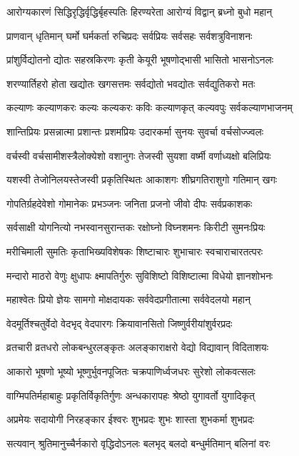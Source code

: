 \twolineshloka
{आरोग्यकारणं सिद्धिरृद्धिर्वृद्धिर्बृहस्पतिः}
{हिरण्यरेता आरोग्यं विद्वान् ब्रध्नो बुधो महान्}%

\twolineshloka
{प्राणवान् धृतिमान् घर्मो घर्मकर्ता रुचिप्रदः}
{सर्वप्रियः सर्वसहः सर्वशत्रुविनाशनः}%

\twolineshloka
{प्रांशुर्विद्योतनो द्योतः सहस्रकिरणः कृती}
{केयूरी भूषणोद्भासी भासितो भासनोऽनलः}%

\twolineshloka
{शरण्यार्तिहरो होता खद्योतः खगसत्तमः}
{सर्वद्योतो भवद्योतः सर्वद्युतिकरो मतः}%

\twolineshloka
{कल्याणः कल्याणकरः कल्यः कल्यकरः कविः}
{कल्याणकृत् कल्यवपुः सर्वकल्याणभाजनम्}%

\twolineshloka
{शान्तिप्रियः प्रसन्नात्मा प्रशान्तः प्रशमप्रियः}
{उदारकर्मा सुनयः सुवर्चा वर्चसोज्ज्वलः}%

\twolineshloka
{वर्चस्वी वर्चसामीशस्त्रैलोक्येशो वशानुगः}
{तेजस्वी सुयशा वर्ष्मी वर्णाध्यक्षो बलिप्रियः}%

\twolineshloka
{यशस्वी तेजोनिलयस्तेजस्वी प्रकृतिस्थितः}
{आकाशगः शीघ्रगतिराशुगो गतिमान् खगः}%

\twolineshloka
{गोपतिर्ग्रहदेवेशो गोमानेकः प्रभञ्जनः}
{जनिता प्रजनो जीवो दीपः सर्वप्रकाशकः}%

\twolineshloka
{सर्वसाक्षी योगनित्यो नभस्वानसुरान्तकः}
{रक्षोघ्नो विघ्नशमनः किरीटी सुमनःप्रियः}%

\twolineshloka
{मरीचिमाली सुमतिः कृताभिख्यविशेषकः}
{शिष्टाचारः शुभाचारः स्वचाराचारतत्परः}%

\twolineshloka
{मन्दारो माठरो वेणुः क्षुधापः क्ष्मापतिर्गुरुः}
{सुविशिष्टो विशिष्टात्मा विधेयो ज्ञानशोभनः}%

\twolineshloka
{महाश्वेतः प्रियो ज्ञेयः सामगो मोक्षदायकः}
{सर्ववेदप्रगीतात्मा सर्ववेदलयो महान्}%

\twolineshloka
{वेदमूर्तिश्चतुर्वेदो वेदभृद् वेदपारगः}
{क्रियावानसितो जिष्णुर्वरीयांशुर्वरप्रदः}%

\twolineshloka
{व्रतचारी व्रतधरो लोकबन्धुरलङ्कृतः}
{अलङ्काराक्षरो वेद्यो विद्यावान् विदिताशयः}%

\twolineshloka
{आकारो भूषणो भूष्यो भूष्णुर्भुवनपूजितः}
{चक्रपाणिर्ध्वजधरः सुरेशो लोकवत्सलः}%

\twolineshloka
{वाग्मिपतिर्महाबाहुः प्रकृतिर्विकृतिर्गुणः}
{अन्धकारापहः श्रेष्ठो युगावर्तो युगादिकृत्}%

\twolineshloka
{अप्रमेयः सदायोगी निरहङ्कार ईश्वरः}
{शुभप्रदः शुभः शास्ता शुभकर्मा शुभप्रदः}%

\twolineshloka
{सत्यवान् श्रुतिमानुच्चैर्नकारो वृद्धिदोऽनलः}
{बलभृद् बलदो बन्धुर्मतिमान् बलिनां वरः}%

